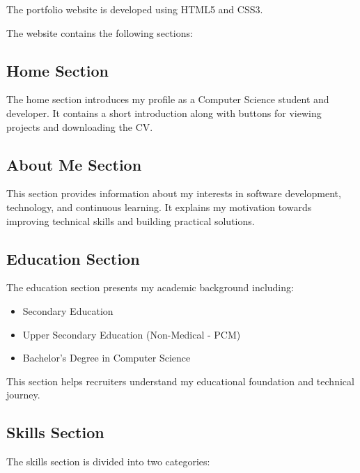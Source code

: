 \documentclass[12pt,a4paper]{article}
\begin{document}
The portfolio website is developed using HTML5 and CSS3.

The website contains the following sections:



\subsection{Home Section}


The home section introduces my profile as a Computer Science student and developer. It contains a short introduction along with buttons for viewing projects and downloading the CV.



\subsection{About Me Section}


This section provides information about my interests in software development, technology, and continuous learning. It explains my motivation towards improving technical skills and building practical solutions.



\subsection{Education Section}


The education section presents my academic background including:


\begin{itemize}

\item Secondary Education

\item Upper Secondary Education (Non-Medical - PCM)

\item Bachelor's Degree in Computer Science

\end{itemize}


This section helps recruiters understand my educational foundation and technical journey.



\subsection{Skills Section}


The skills section is divided into two categories:
\end{document}
